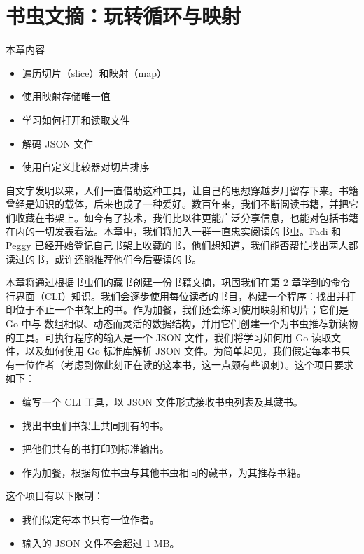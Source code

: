 \chapter{书虫文摘：玩转循环与映射}

\begin{infobox}{本章内容}
\begin{itemize}
  \item 遍历切片（slice）和映射（map）
  \item 使用映射存储唯一值
  \item 学习如何打开和读取文件
  \item 解码 JSON 文件
  \item 使用自定义比较器对切片排序
\end{itemize}
\end{infobox}

自文字发明以来，人们一直借助这种工具，让自己的思想穿越岁月留存下来。书籍曾经是知识的载体，后来也成了一种爱好。数百年来，我们不断阅读书籍，并把它们收藏在书架上。如今有了技术，我们比以往更能广泛分享信息，也能对包括书籍在内的一切发表看法。本章中，我们将加入一群一直忠实阅读的书虫。Fadi 和 Peggy 已经开始登记自己书架上收藏的书，他们想知道，我们能否帮忙找出两人都读过的书，或许还能推荐他们今后要读的书。

本章将通过根据书虫们的藏书创建一份书籍文摘，巩固我们在第 2 章学到的命令行界面（CLI）知识。我们会逐步使用每位读者的书目，构建一个程序：找出并打印位于不止一个书架上的书。作为加餐，我们还会练习使用映射和切片；它们是 Go 中与
数组相似、动态而灵活的数据结构，并用它们创建一个为书虫推荐新读物的工具。可执行程序的输入是一个 JSON 文件，我们将学习如何用 Go 读取文件，以及如何使用 Go 标准库解析 JSON 文件。为简单起见，我们假定每本书只有一位作者（考虑到你此刻正在读的这本书，这一点颇有些讽刺）。这个项目要求如下：

\begin{itemize}
  \item 编写一个 CLI 工具，以 JSON 文件形式接收书虫列表及其藏书。
  \item 找出书虫们书架上共同拥有的书。
  \item 把他们共有的书打印到标准输出。
  \item 作为加餐，根据每位书虫与其他书虫相同的藏书，为其推荐书籍。
\end{itemize}

这个项目有以下限制：

\begin{itemize}
  \item 我们假定每本书只有一位作者。
  \item 输入的 JSON 文件不会超过 1 MB。
\end{itemize}

